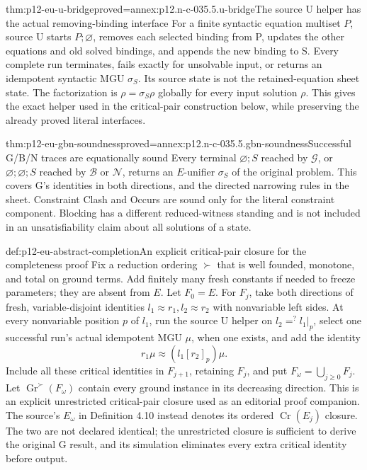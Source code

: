 \begin{hblemma}{thm:p12-eu-u-bridge}{proved=annex:p12.n-c-035.5.u-bridge}{The source U helper has the actual removing-binding interface}
For a finite syntactic equation multiset \(P\), source U starts
\(P;\varnothing\), removes each selected binding from P, updates
the other equations and old solved bindings, and appends the new
binding to S. Every complete run terminates, fails exactly for
unsolvable input, or returns an idempotent syntactic MGU \(\sigma_S\).
Its source state is not the retained-equation sheet state.
The factorization is \(\rho=\sigma_S\rho\) globally for every
input solution \(\rho\). This gives the exact helper used in the
critical-pair construction below, while preserving the already proved
literal interfaces. \cite[\S2.2.3--2.2.4, pp.~454--457]{BaaderSnyder2001}
\end{hblemma}

\begin{hbtheorem}{thm:p12-eu-gbn-soundness}{proved=annex:p12.n-c-035.5.gbn-soundness}{Successful G/B/N traces are equationally sound}
Every terminal \(\varnothing;S\) reached by \(\mathcal G\), or
\(\varnothing;\varnothing;S\) reached by \(\mathcal B\) or \(\mathcal N\),
returns an \(E\)-unifier \(\sigma_S\) of the original problem.
This covers G's identities in both directions, and the directed
narrowing rules in the sheet. Constraint Clash and Occurs are sound
only for the literal constraint component. Blocking has a different
reduced-witness standing and is not included in an unsatisfiability
claim about all solutions of a state.
\end{hbtheorem}

\begin{hbdefinition}{def:p12-eu-abstract-completion}{An explicit critical-pair closure for the completeness proof}
Fix a reduction ordering \(\succ\) that is well founded, monotone,
and total on ground terms. Add finitely many fresh constants if needed
to freeze parameters; they are absent from \(E\). Let \(F_0=E\).
For \(F_j\), take both directions of fresh, variable-disjoint identities
\(l_1\approx r_1,l_2\approx r_2\) with nonvariable left sides.
At every nonvariable position \(p\) of \(l_1\), run the source U
helper on \(l_2=^{?}l_1|_p\), select one successful run's actual
idempotent MGU \(\mu\), when one exists, and
add the identity
\[
                   r_1\mu\approx (l_1[r_2]_p)\mu.
\]
Include all these critical identities in \(F_{j+1}\), retaining
\(F_j\), and put \(F_\omega=\bigcup_{j\geq0}F_j\).
Let \(\operatorname{Gr}^{\succ}(F_\omega)\) contain every ground
instance in its decreasing direction. This is an explicit unrestricted
critical-pair closure used as an editorial proof companion. The source's
\(E_\omega\) in Definition 4.10 instead denotes its ordered
\(\operatorname{Cr}(E_j)\) closure. The two are not declared identical;
the unrestricted closure is sufficient to derive the original G result,
and its simulation eliminates every extra critical identity before output.
\cite[Definitions 4.4 and 4.10, Lemma 4.11, pp.~490,492--493]{BaaderSnyder2001}
\end{hbdefinition}

